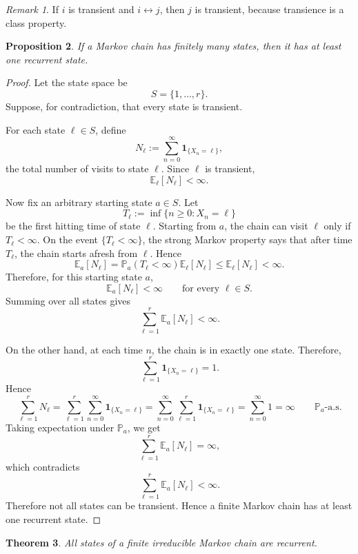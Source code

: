 \documentclass[11pt]{article}
\theoremstyle{plain}
\newtheorem{theorem}{Theorem}[section]
\newtheorem{proposition}[theorem]{Proposition}
\theoremstyle{definition}
\theoremstyle{remark}
\newtheorem{remark}[theorem]{Remark}
\begin{document}
\begin{remark}
	If \(i\) is transient and \(i\leftrightarrow j\), then \(j\) is transient, because transience is a class property.
\end{remark}



\begin{proposition}
	If a Markov chain has finitely many states, then it has at least one recurrent state.
\end{proposition}

\begin{proof}
	Let the state space be
	\[
	S=\{1,\dots,r\}.
	\]
	Suppose, for contradiction, that every state is transient.
	
	For each state \(\ell\in S\), define
	\[
	N_\ell
	:=
	\sum_{n=0}^{\infty}\mathbf{1}_{\{X_n=\ell\}},
	\]
	the total number of visits to state \(\ell\). Since \(\ell\) is transient,
	\[
	\mathbb{E}_\ell[N_\ell]<\infty.
	\]
	
	Now fix an arbitrary starting state \(a\in S\). Let
	\[
	T_\ell:=\inf\{n\ge 0:X_n=\ell\}
	\]
	be the first hitting time of state \(\ell\). Starting from \(a\), the chain can visit \(\ell\) only if \(T_\ell<\infty\). On the event \(\{T_\ell<\infty\}\), the strong Markov property says that after time \(T_\ell\), the chain starts afresh from \(\ell\). Hence
	\[
	\mathbb{E}_a[N_\ell]
	=
	\mathbb{P}_a(T_\ell<\infty)\mathbb{E}_\ell[N_\ell]
	\le
	\mathbb{E}_\ell[N_\ell]
	<\infty.
	\]
	Therefore, for this starting state \(a\),
	\[
	\mathbb{E}_a[N_\ell]<\infty
	\qquad
	\text{for every } \ell\in S.
	\]
	Summing over all states gives
	\[
	\sum_{\ell=1}^r \mathbb{E}_a[N_\ell]<\infty.
	\]
	
	On the other hand, at each time \(n\), the chain is in exactly one state. Therefore,
	\[
	\sum_{\ell=1}^r \mathbf{1}_{\{X_n=\ell\}}=1.
	\]
	Hence
	\[
	\sum_{\ell=1}^r N_\ell
	=
	\sum_{\ell=1}^r\sum_{n=0}^{\infty}\mathbf{1}_{\{X_n=\ell\}}
	=
	\sum_{n=0}^{\infty}\sum_{\ell=1}^r\mathbf{1}_{\{X_n=\ell\}}
	=
	\sum_{n=0}^{\infty}1
	=
	\infty
	\qquad \mathbb{P}_a\text{-a.s.}
	\]
	Taking expectation under \(\mathbb{P}_a\), we get
	\[
	\sum_{\ell=1}^r \mathbb{E}_a[N_\ell]=\infty,
	\]
	which contradicts
	\[
	\sum_{\ell=1}^r \mathbb{E}_a[N_\ell]<\infty.
	\]
	Therefore not all states can be transient. Hence a finite Markov chain has at least one recurrent state.
\end{proof}

\begin{theorem}
	All states of a finite irreducible Markov chain are recurrent.
\end{theorem}
\end{document}
